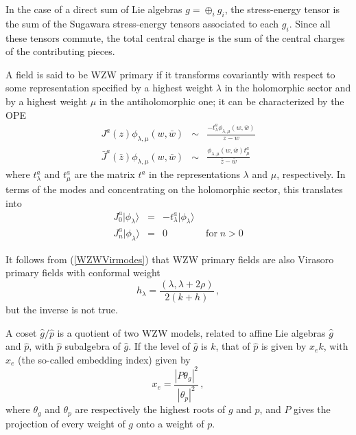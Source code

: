 \documentclass[a4paper,12pt]{report}
\begin{document}
In the case of a direct sum of Lie algebras $g=\oplus_{i}g_{i}$, the stress-energy tensor is the sum of the
Sugawara stress-energy tensors associated to each $g_{i}$. Since all these tensors commute, the total central
charge is the sum of the central charges of the contributing pieces.

A field is said to be WZW primary if it transforms covariantly with respect to some representation specified by a
highest weight $\lambda$ in the holomorphic sector and by a highest weight $\mu$ in the antiholomorphic one; it
can be characterized by the OPE
\begin{eqnarray}
J^{a}(z)\phi_{\lambda,\mu}(w,\bar{w})&\sim& \frac{-t_{\lambda}^{a}\phi_{\lambda,\mu}(w,\bar{w})}{z-w}\\
\bar{J}^{a}(\bar{z})\phi_{\lambda,\mu}(w,\bar{w})&\sim&
\frac{\phi_{\lambda,\mu}(w,\bar{w})t_{\mu}^{a}}{\bar{z}-\bar{w}}
\end{eqnarray}
where $t_{\lambda}^{a}$ and $t_{\mu}^{a}$ are the matrix $t^{a}$ in the representations $\lambda$ and $\mu$,
respectively. In terms of the modes and concentrating on the holomorphic sector, this translates into
\begin{eqnarray}
J_{0}^{a}|\phi_{\lambda}\rangle &=& -t_{\lambda}^{a}|\phi_{\lambda}\rangle\\
J_{n}^{a}|\phi_{\lambda}\rangle &=& 0\qquad\qquad\textrm{for}\; n>0
\end{eqnarray}

It follows from (\ref{WZWVirmodes}) that WZW primary fields are also Virasoro primary fields with conformal weight
\begin{equation}\label{WZWVirh}
h_{\lambda}=\frac{(\lambda,\lambda+2\rho)}{2(k+h)}\,,
\end{equation}
but the inverse is not true.


\vspace{1cm}

A coset $\hat{g}/\hat{p}$ is a quotient of two WZW models, related to affine Lie algebras $\hat{g}$ and $\hat{p}$,
with $\hat{p}$ subalgebra of $\hat{g}$. If the level of $\hat{g}$ is $k$, that of $\hat{p}$ is given by $x_{e}k$,
with $x_{e}$ (the so-called embedding index) given by
\begin{equation}
x_{e}=\frac{|P\theta_{g}|^{2}}{|\theta_{p}|^{2}}\,,
\end{equation}
where $\theta_{g}$ and $\theta_{p}$ are respectively the highest roots of $g$ and $p$, and $P$ gives the
projection of every weight of $g$ onto a weight of $p$.
\end{document}
